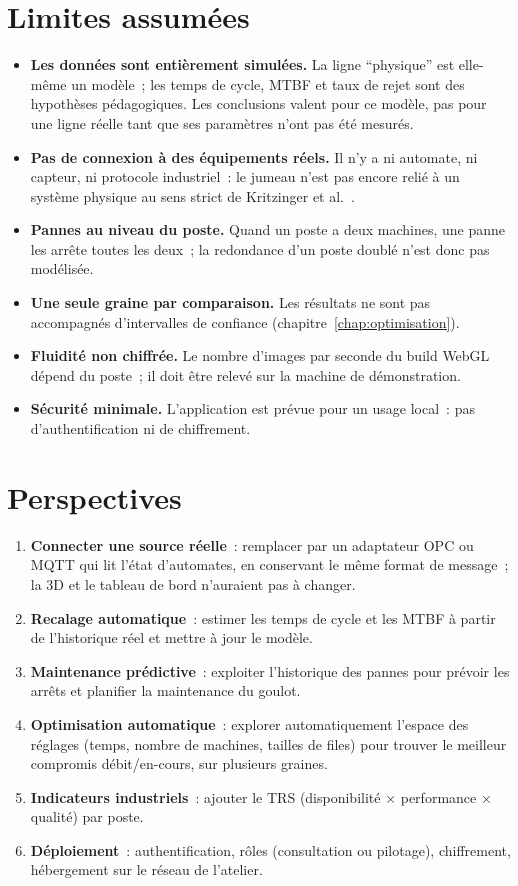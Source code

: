 \section{Limites assumées}

\begin{itemize}
  \item \textbf{Les données sont entièrement simulées.} La ligne \enquote{physique} est elle-même un modèle~; les temps de cycle, \ac{MTBF} et taux de rejet sont des hypothèses pédagogiques. Les conclusions valent pour ce modèle, pas pour une ligne réelle tant que ses paramètres n'ont pas été mesurés.
  \item \textbf{Pas de connexion à des équipements réels.} Il n'y a ni automate, ni capteur, ni protocole industriel~: le jumeau n'est pas encore relié à un système physique au sens strict de Kritzinger et al.~\cite{kritzinger2018}.
  \item \textbf{Pannes au niveau du poste.} Quand un poste a deux machines, une panne les arrête toutes les deux~; la redondance d'un poste doublé n'est donc pas modélisée.
  \item \textbf{Une seule graine par comparaison.} Les résultats ne sont pas accompagnés d'intervalles de confiance (chapitre~\ref{chap:optimisation}).
  \item \textbf{Fluidité non chiffrée.} Le nombre d'images par seconde du build WebGL dépend du poste~; il doit être relevé sur la machine de démonstration.
  \item \textbf{Sécurité minimale.} L'application est prévue pour un usage local~: pas d'authentification ni de chiffrement.
\end{itemize}

\section{Perspectives}

\begin{enumerate}
  \item \textbf{Connecter une source réelle}~: remplacer  par un adaptateur \ac{OPC} ou MQTT qui lit l'état d'automates, en conservant le même format de message~; la \ac{3D} et le tableau de bord n'auraient pas à changer.
  \item \textbf{Recalage automatique}~: estimer les temps de cycle et les \ac{MTBF} à partir de l'historique réel et mettre à jour le modèle.
  \item \textbf{Maintenance prédictive}~: exploiter l'historique des pannes pour prévoir les arrêts et planifier la maintenance du goulot.
  \item \textbf{Optimisation automatique}~: explorer automatiquement l'espace des réglages (temps, nombre de machines, tailles de files) pour trouver le meilleur compromis débit/en-cours, sur plusieurs graines.
  \item \textbf{Indicateurs industriels}~: ajouter le \ac{TRS} (disponibilité $\times$ performance $\times$ qualité) par poste.
  \item \textbf{Déploiement}~: authentification, rôles (consultation ou pilotage), chiffrement, hébergement sur le réseau de l'atelier.
\end{enumerate}


